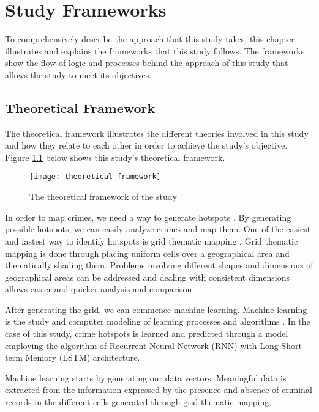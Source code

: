 \chapter{Study Frameworks}
    To comprehensively describe the approach that this study takes, this chapter illustrates and explains the frameworks that this study follows. The frameworks show the flow of logic and processes behind the approach of this study that allows the study to meet its objectives.
\section{Theoretical Framework}

The theoretical framework illustrates the different theories involved in this study and how they relate to each other in order to achieve the study's objective. Figure \ref{fig:theoretical-framework} below shows this study's theoretical framework.
\begin{figure}[H]
    \centering
    \texttt{[image: theoretical-framework]}
    \caption{The theoretical framework of the study}
    \label{fig:theoretical-framework}
\end{figure}
In order to map crimes, we need a way to generate hotspots \citep{eck2005mapping}. By generating possible hotspots, we can easily analyze crimes and map them. One of the easiest and fastest way to identify hotspots is grid thematic mapping \citep{chainey2008utility}. Grid thematic mapping is done through placing uniform cells over a geographical area and thematically shading them. Problems involving different shapes and dimensions of geographical areas can be addressed and dealing with consistent dimensions allows easier and quicker analysis and comparison.

After generating the grid, we can commence machine learning. Machine learning is the study and computer modeling of learning processes and algorithms \citep{michalski2013machine}. In the case of this study, crime hotspots is learned and predicted through a model employing the algorithm of Recurrent Neural Network (RNN) with Long Short-term Memory (LSTM) architecture. 

Machine learning starts by generating our data vectors. Meaningful data is extracted from the information expressed by the presence and absence of criminal records in the different cells generated through grid thematic mapping.

